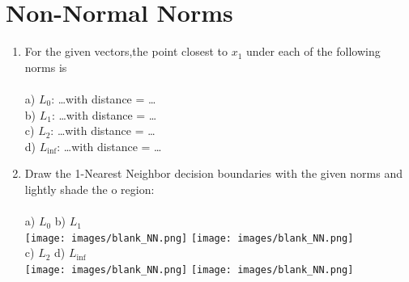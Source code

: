 \section{Non-Normal Norms}

\begin{enumerate}
\item

For the given vectors,the point closest to $x_1$ under each of the following norms is \\\\
a) $L_0$: \ldots with distance = \ldots \\
b) $L_1$: \ldots with distance = \ldots \\
c) $L_2$: \ldots with distance = \ldots \\
d) $L_{\inf}$: \ldots with distance = \ldots \\

\item 

Draw the 1-Nearest Neighbor decision boundaries with the given norms and lightly shade the o region: \\ \\ a) $L_0$ \qquad \qquad \qquad \qquad \qquad \qquad \qquad \qquad b) $L_1$\\ 
\texttt{[image: images/blank\_NN.png]}
\texttt{[image: images/blank\_NN.png]} \\
c) $L_2$ \qquad \qquad \qquad \qquad \qquad \qquad \qquad \qquad d) $L_{\inf}$\\
\texttt{[image: images/blank\_NN.png]}
\texttt{[image: images/blank\_NN.png]} \\

\end{enumerate}

